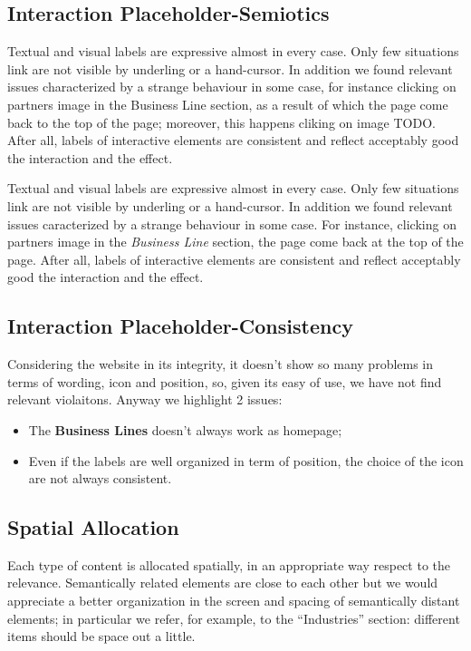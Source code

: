 \subsection{Interaction Placeholder-Semiotics}

Textual and visual labels are expressive almost in every case. Only few situations link are not visible by underling or a hand-cursor. In addition we found relevant issues characterized by a strange behaviour in some case, for instance clicking on partners image in the Business Line section, as a result of which the page come back to the top of the page; moreover, this happens cliking on image TODO. After all, labels of interactive elements are consistent and reflect acceptably good the interaction and the effect.

Textual and visual labels are expressive almost in every case. Only few situations link are not visible by underling or a hand-cursor. In addition we found relevant issues caracterized by a strange behaviour in some case. For instance, clicking on partners image in the \textit{Business Line} section, the page come back at the top of the page. 
After all, labels of interactive elements are consistent and reflect acceptably good the interaction and the effect.


\begin{comment} 
Moreover, it happens that cliking on image TODO. 
\end{comment}

\subsection{Interaction Placeholder-Consistency}
Considering the website in its integrity, it doesn’t show so many problems in terms of wording, icon and position, so, given its easy of use, we have not find relevant violaitons. 
Anyway we highlight 2 issues:
\begin{itemize}
\item The \textbf{Business Lines} doesn’t always work as homepage;
\item Even if the labels are well organized in term of position, the choice of the icon are not always consistent.
\end{itemize}
\subsection{Spatial Allocation}
Each type of content is allocated spatially, in an appropriate way respect to the relevance. Semantically related elements are close to each other but we would appreciate a better organization in the screen and spacing of semantically distant elements; in particular we refer, for example, to the “Industries” section: different items should be space out a little. 
